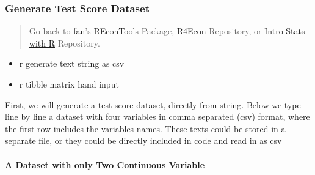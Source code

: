 \documentclass[
]{book}
\providecommand{\tightlist}{%
  \setlength{\itemsep}{0pt}\setlength{\parskip}{0pt}}
\begin{document}
\hypertarget{generate-test-score-dataset}{%
\subsubsection{Generate Test Score Dataset}\label{generate-test-score-dataset}}

\begin{quote}
Go back to \href{http://fanwangecon.github.io/CodeDynaAsset/}{fan}'s \href{https://fanwangecon.github.io/REconTools/}{REconTools} Package, \href{https://fanwangecon.github.io/R4Econ/}{R4Econ} Repository, or \href{https://fanwangecon.github.io/Stat4Econ/}{Intro Stats with R} Repository.
\end{quote}

\begin{itemize}
\tightlist
\item
  r generate text string as csv
\item
  r tibble matrix hand input
\end{itemize}

First, we will generate a test score dataset, directly from string. Below we type line by line a dataset with four variables in comma separated (csv) format, where the first row includes the variables names. These texts could be stored in a separate file, or they could be directly included in code and read in as csv

\hypertarget{a-dataset-with-only-two-continuous-variable}{%
\paragraph{A Dataset with only Two Continuous Variable}\label{a-dataset-with-only-two-continuous-variable}}
\end{document}
